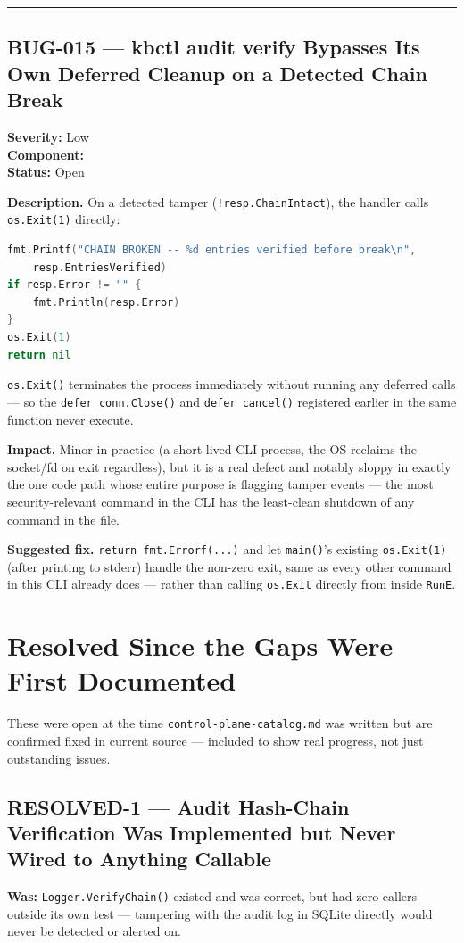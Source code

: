 \documentclass[11pt,a4paper]{article}
\newcommand{\bugmeta}[3]{%
  \noindent\textbf{Severity:} #1 \\
  \textbf{Component:} \ttfamily\seqsplit{#2}\normalfont \\
  \textbf{Status:} #3
  \par\vspace{0.5em}
}
\newcommand{\entrysep}{\vspace{0.4em}\noindent\rule{\linewidth}{0.3pt}\vspace{1.1em}}
\begin{document}
\entrysep

\subsection*{BUG-015 --- kbctl audit verify Bypasses Its Own Deferred Cleanup on a Detected Chain Break}
\bugmeta{Low}{kb-op/kbctl/cmd\_audit.go, auditVerifyCmd}{Open}

\textbf{Description.} On a detected tamper (\texttt{!resp.ChainIntact}),
the handler calls \texttt{os.Exit(1)} directly:
\begin{lstlisting}[language=Go]
fmt.Printf("CHAIN BROKEN -- %d entries verified before break\n",
    resp.EntriesVerified)
if resp.Error != "" {
    fmt.Println(resp.Error)
}
os.Exit(1)
return nil
\end{lstlisting}
\texttt{os.Exit()} terminates the process immediately without running any
deferred calls --- so the \texttt{defer conn.Close()} and
\texttt{defer cancel()} registered earlier in the same function never
execute.

\textbf{Impact.} Minor in practice (a short-lived CLI process, the OS
reclaims the socket/fd on exit regardless), but it is a real defect and
notably sloppy in exactly the one code path whose entire purpose is
flagging tamper events --- the most security-relevant command in the CLI
has the least-clean shutdown of any command in the file.

\textbf{Suggested fix.} \texttt{return fmt.Errorf(...)} and let
\texttt{main()}'s existing \texttt{os.Exit(1)} (after printing to stderr)
handle the non-zero exit, same as every other command in this CLI already
does --- rather than calling \texttt{os.Exit} directly from inside
\texttt{RunE}.

\clearpage

\section{Resolved Since the Gaps Were First Documented}

These were open at the time \texttt{control-plane-catalog.md} was written
but are confirmed fixed in current source --- included to show real
progress, not just outstanding issues.

\subsection*{RESOLVED-1 --- Audit Hash-Chain Verification Was Implemented but Never Wired to Anything Callable}
\textbf{Was:} \texttt{Logger.VerifyChain()} existed and was correct, but
had zero callers outside its own test --- tampering with the audit log in
SQLite directly would never be detected or alerted on.
\end{document}
